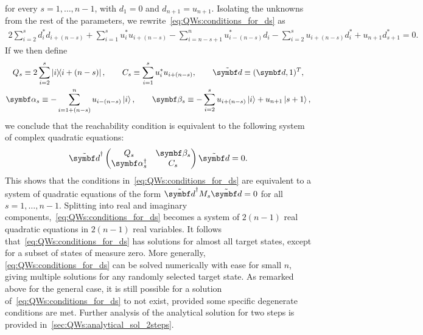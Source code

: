 for every $s=1,\dots,n-1$,
with $d_1=0$ and $d_{n+1}=u_{n+1}$.
Isolating the unknowns from the rest of the parameters, we rewrite~\cref{eq:QWs:conditions_for_ds} as
{\small\begin{equation}
\begin{aligned}%
    2\sum_{i=2}^s d_i^* d_{i+(n-s)}
    + \sum_{i=1}^s u_i^* u_{i+(n-s)}
    - \sum_{i=n-s+1}^{n} u_{i-(n-s)}^* d_i
    - \sum_{i=2}^{s} u_{i+(n-s)} d_i^*
    + u_{n+1} d_{s+1}^* 
    = 0.
\end{aligned}
\end{equation}}
If we then define
\begin{equation}
\begin{gathered}
    Q_s \equiv 2\sum_{i=2}^s \ketbra{i}{i+(n-s)},
    \qquad
    C_s \equiv \sum_{i=1}^s u_i^* u_{i+(n-s)},
    \qquad
    \tilde{\bs d} \equiv (\bs d, 1)^T, \\
    \bs\alpha_s \equiv -\sum_{i=1+(n-s)}^n u_{i-(n-s)}\ket{i},
    \qquad
    \bs\beta_s \equiv -\sum_{i=2}^{s} u_{i+(n-s)}\ket{i} + u_{n+1} \ket{s+1},
\end{gathered}
\end{equation}
we conclude that the reachability condition is equivalent to the following system of complex quadratic equations:
\begin{equation}
    \tilde{\bs d}^\dagger
    \begin{pmatrix}
        Q_s & \bs\beta_s \\
        \bs\alpha_s^\dagger & C_s
    \end{pmatrix}
    \tilde{\bs d} = 0.
\end{equation}
This shows that the conditions in~\cref{eq:QWs:conditions_for_ds} are equivalent to a system of quadratic equations of the form $\tilde{\bs d}^\dagger M_s \tilde{\bs d}=0$ for all $s=1,\dots,n-1$.
Splitting into real and imaginary components,~\cref{eq:QWs:conditions_for_ds} becomes a system of $2(n-1)$ real quadratic equations in $2(n-1)$ real variables.
It follows that~\cref{eq:QWs:conditions_for_ds} has solutions for almost all target states, except for a subset of states of measure zero.
More generally, \cref{eq:QWs:conditions_for_ds}
can be solved numerically with ease for small $n$, giving multiple solutions for any randomly selected target state.
As remarked above for the general case, it is still possible for a solution of~\cref{eq:QWs:conditions_for_ds} to not exist, provided some specific degenerate conditions are met.
Further analysis of the analytical solution for two steps is provided in~\cref{sec:QWs:analytical_sol_2steps}.

